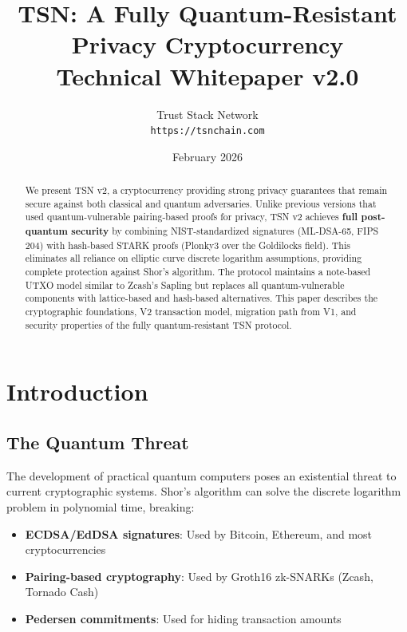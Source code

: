 \documentclass[11pt,a4paper]{article}
\title{
    \vspace{-1cm}
    \textbf{TSN: A Fully Quantum-Resistant Privacy Cryptocurrency}\\[0.5em]
    \large Technical Whitepaper v2.0
}
\author{
    Trust Stack Network\\
    \texttt{https://tsnchain.com}
}
\date{February 2026}
\begin{document}
\maketitle

\begin{abstract}
We present TSN v2, a cryptocurrency providing strong privacy guarantees that remain secure against both classical and quantum adversaries. Unlike previous versions that used quantum-vulnerable pairing-based proofs for privacy, TSN v2 achieves \textbf{full post-quantum security} by combining NIST-standardized signatures (ML-DSA-65, FIPS 204) with hash-based STARK proofs (Plonky3 over the Goldilocks field). This eliminates all reliance on elliptic curve discrete logarithm assumptions, providing complete protection against Shor's algorithm. The protocol maintains a note-based UTXO model similar to Zcash's Sapling but replaces all quantum-vulnerable components with lattice-based and hash-based alternatives. This paper describes the cryptographic foundations, V2 transaction model, migration path from V1, and security properties of the fully quantum-resistant TSN protocol.
\end{abstract}

\tableofcontents
\newpage

\section{Introduction}

\subsection{The Quantum Threat}

The development of practical quantum computers poses an existential threat to current cryptographic systems. Shor's algorithm can solve the discrete logarithm problem in polynomial time, breaking:

\begin{itemize}
    \item \textbf{ECDSA/EdDSA signatures}: Used by Bitcoin, Ethereum, and most cryptocurrencies
    \item \textbf{Pairing-based cryptography}: Used by Groth16 zk-SNARKs (Zcash, Tornado Cash)
    \item \textbf{Pedersen commitments}: Used for hiding transaction amounts
\end{itemize}
\end{document}
